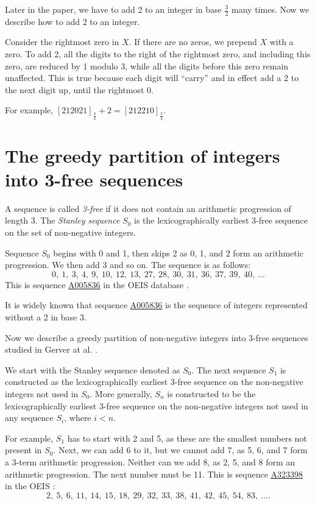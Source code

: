 \documentclass[12pt,reqno]{article}
\theoremstyle{plain}
\theoremstyle{definition}
\theoremstyle{remark}
\newcommand{\seqnum}[1]{\href{https://oeis.org/#1}{\underline{#1}}}
\begin{document}
Later in the paper, we have to add 2 to an integer in base $\frac{3}{2}$ many times. Now we describe how to add 2 to an integer.

Consider the rightmost zero in $X$. If there are no zeros, we prepend $X$ with a zero. To add 2, all the digits to the right of the rightmost zero, and including this zero, are reduced by 1 modulo 3, while all the digits before this zero remain unaffected. This is true because each digit will ``carry'' and in effect add a 2 to the next digit up, until the rightmost 0.

For example, $[212021]_{\frac{3}{2}} + 2 = [212210]_{\frac{3}{2}}$.


\section{The greedy partition of integers into 3-free sequences}\label{sec:greedypart}

A sequence is called \textit{3-free} if it does not contain an arithmetic progression of length 3. The \textit{Stanley sequence} $S_0$ is the lexicographically earliest 3-free sequence on the set of non-negative integers.

Sequence $S_0$ begins with 0 and 1, then skips 2 as 0, 1, and 2 form an arithmetic progression. We then add 3 and so on. The sequence is as follows:
\[0,\ 1,\ 3,\ 4,\ 9,\ 10,\ 12,\ 13,\ 27,\ 28,\ 30,\ 31,\ 36,\ 37,\ 39,\ 40,\ \ldots \]
This is sequence \seqnum{A005836} in the OEIS database \cite{OEIS}.

It is widely known that sequence \seqnum{A005836} is the sequence of integers represented without a 2 in base 3. 

Now we describe a greedy partition of non-negative integers into 3-free sequences studied in Gerver at al. \cite{GPS}. 

We start with the Stanley sequence denoted as $S_0$. The next sequence $S_1$ is constructed as the lexicographically earliest 3-free sequence on the non-negative integers not used in $S_0$. More generally, $S_n$ is constructed to be the lexicographically earliest 3-free sequence on the non-negative integers not used in any sequence $S_i$, where $i<n$.

For example, $S_1$ has to start with 2 and 5, as these are the smallest numbers not present in $S_0$. Next, we can add 6 to it, but we cannot add 7, as 5, 6, and 7 form a 3-term arithmetic progression. Neither can we add 8, as 2, 5, and 8 form an arithmetic progression. The next number must be 11. This is sequence \seqnum{A323398} in the OEIS \cite{OEIS}:
\[2,\ 5,\ 6,\ 11,\ 14,\ 15,\ 18,\ 29,\ 32,\ 33,\ 38,\ 41,\ 42,\ 45,\ 54,\ 83,\ \ldots.\]
\end{document}
